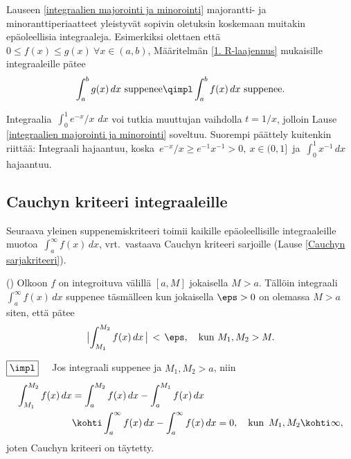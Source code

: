 Lauseen \ref{integraalien majorointi ja minorointi} majorantti- ja minoranttiperiaatteet
yleistyvät sopivin oletuksin koskemaan muitakin epäoleellisia integraaleja. Esimerkiksi
olettaen että $0 \le f(x) \le g(x)\ \forall x\in(a,b)$, Määritelmän \ref{1. R-laajennus}
mukaisille integraaleille pätee
\[
\int_a^b g(x)\,dx\ \text{suppenee} \qimpl \int_a^b f(x)\,dx\ \text{suppenee}.
\]
\begin{Exa} Integraalia $\,\int_0^1 e^{-x}/x\,\,dx$ voi tutkia muuttujan vaihdolla $t=1/x$,
jolloin Lause \ref{integraalien majorointi ja minorointi} soveltuu. Suorempi päättely kuitenkin
riittää: Integraali hajaantuu, koska $\,e^{-x}/x \ge e^{-1}x^{-1} > 0,\ x\in(0,1]\,$ ja
$\,\int_0^1 x^{-1}\,dx$ hajaantuu. \loppu
\end{Exa}

\subsection*{Cauchyn kriteeri integraaleille}

Seuraava yleinen suppenemiskriteeri toimii kaikille epäoleellisille integraaleille muotoa
$\,\int_a^\infty f(x)\,dx$, vrt.\ vastaava Cauchyn kriteeri sarjoille
(Lause \ref{Cauchyn sarjakriteeri}).
\begin{Lause} \label{Cauchyn integraalikriteeri} ()
Olkoon $f$ on integroituva välillä $[a,M]$ jokaisella $M>a$. Tällöin integraali
$\int_a^\infty f(x)\, dx$ suppenee täsmälleen kun jokaisella $\eps>0$ on olemassa $M>a$ siten,
että pätee
\[
\bigl|\int_{M_1}^{M_2} f(x)\,dx\,\bigr| \,<\, \eps, \quad \text{kun}\ M_1,M_2>M.
\]
\end{Lause}
\tod $\boxed{\impl}\quad$ Jos integraali suppenee ja $M_1,M_2>a$, niin
\begin{align*}
\int_{M_1}^{M_2} f(x)\, dx &= \int_a^{M_2} f(x)\, dx-\int_a^{M_1} f(x)\, dx \\
                            &\kohti \int_a^\infty f(x)\, dx-\int_a^\infty f(x)\, dx=0, \quad 
                                                      \text{kun}\,\ M_1,M_2\kohti\infty,
\end{align*}
joten Cauchyn kriteeri on täytetty.

